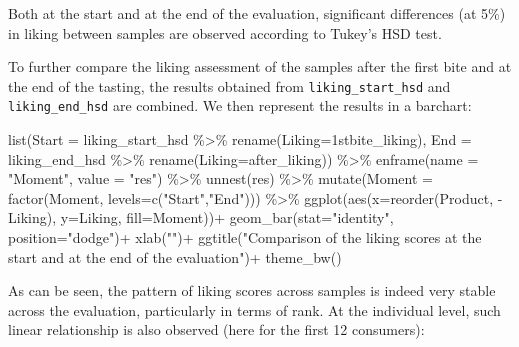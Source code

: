 \documentclass[
]{book}
\newenvironment{Shaded}{\begin{snugshade}}{\end{snugshade}}
\newcommand{\AttributeTok}[1]{\textcolor[rgb]{0.77,0.63,0.00}{#1}}
\newcommand{\FunctionTok}[1]{\textcolor[rgb]{0.00,0.00,0.00}{#1}}
\newcommand{\NormalTok}[1]{#1}
\newcommand{\SpecialCharTok}[1]{\textcolor[rgb]{0.00,0.00,0.00}{#1}}
\newcommand{\StringTok}[1]{\textcolor[rgb]{0.31,0.60,0.02}{#1}}
\begin{document}
Both at the start and at the end of the evaluation, significant differences (at 5\%) in liking between samples are observed according to Tukey's HSD test.

To further compare the liking assessment of the samples after the first bite and at the end of the tasting, the results obtained from \texttt{liking\_start\_hsd} and \texttt{liking\_end\_hsd} are combined. We then represent the results in a barchart:

\begin{Shaded}
\begin{Highlighting}[]
\FunctionTok{list}\NormalTok{(}\AttributeTok{Start =}\NormalTok{ liking\_start\_hsd }\SpecialCharTok{\%\textgreater{}\%} \FunctionTok{rename}\NormalTok{(}\AttributeTok{Liking=}\StringTok{\textasciigrave{}}\AttributeTok{1stbite\_liking}\StringTok{\textasciigrave{}}\NormalTok{), }
     \AttributeTok{End =}\NormalTok{ liking\_end\_hsd }\SpecialCharTok{\%\textgreater{}\%} \FunctionTok{rename}\NormalTok{(}\AttributeTok{Liking=}\StringTok{\textasciigrave{}}\AttributeTok{after\_liking}\StringTok{\textasciigrave{}}\NormalTok{)) }\SpecialCharTok{\%\textgreater{}\%} 
  \FunctionTok{enframe}\NormalTok{(}\AttributeTok{name =} \StringTok{"Moment"}\NormalTok{, }\AttributeTok{value =} \StringTok{"res"}\NormalTok{) }\SpecialCharTok{\%\textgreater{}\%} 
  \FunctionTok{unnest}\NormalTok{(res) }\SpecialCharTok{\%\textgreater{}\%} 
  \FunctionTok{mutate}\NormalTok{(}\AttributeTok{Moment =} \FunctionTok{factor}\NormalTok{(Moment, }\AttributeTok{levels=}\FunctionTok{c}\NormalTok{(}\StringTok{"Start"}\NormalTok{,}\StringTok{"End"}\NormalTok{))) }\SpecialCharTok{\%\textgreater{}\%} 
  \FunctionTok{ggplot}\NormalTok{(}\FunctionTok{aes}\NormalTok{(}\AttributeTok{x=}\FunctionTok{reorder}\NormalTok{(Product, }\SpecialCharTok{{-}}\NormalTok{Liking), }\AttributeTok{y=}\NormalTok{Liking, }\AttributeTok{fill=}\NormalTok{Moment))}\SpecialCharTok{+}
  \FunctionTok{geom\_bar}\NormalTok{(}\AttributeTok{stat=}\StringTok{"identity"}\NormalTok{, }\AttributeTok{position=}\StringTok{"dodge"}\NormalTok{)}\SpecialCharTok{+}
  \FunctionTok{xlab}\NormalTok{(}\StringTok{""}\NormalTok{)}\SpecialCharTok{+}
  \FunctionTok{ggtitle}\NormalTok{(}\StringTok{"Comparison of the liking scores at the start and at the end of the evaluation"}\NormalTok{)}\SpecialCharTok{+}
  \FunctionTok{theme\_bw}\NormalTok{()}
\end{Highlighting}
\end{Shaded}

As can be seen, the pattern of liking scores across samples is indeed very stable across the evaluation, particularly in terms of rank.
At the individual level, such linear relationship is also observed (here for the first 12 consumers):
\end{document}
